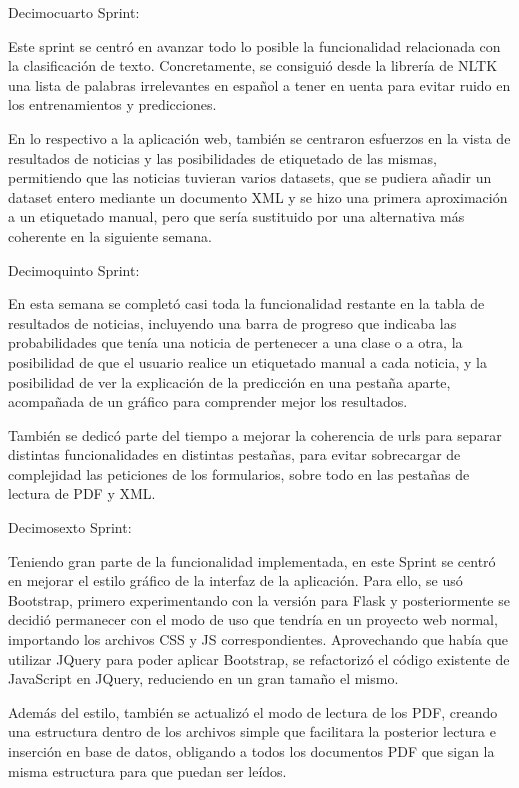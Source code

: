 Decimocuarto Sprint:

Este sprint se centró en avanzar todo lo posible la funcionalidad relacionada con la clasificación de texto. Concretamente, se consiguió desde la librería de NLTK una lista de palabras irrelevantes en español a tener en uenta para evitar ruido en los entrenamientos y predicciones. 

En lo respectivo a la aplicación web, también se centraron esfuerzos en la vista de resultados de noticias y las posibilidades de etiquetado de las mismas, permitiendo que las noticias tuvieran varios datasets, que se pudiera añadir un dataset entero mediante un documento XML y se hizo una primera aproximación a un etiquetado manual, pero que sería sustituido por una alternativa más coherente en la siguiente semana.

Decimoquinto Sprint:

En esta semana se completó casi toda la funcionalidad restante en la tabla de resultados de noticias, incluyendo una barra de progreso que indicaba las probabilidades que tenía una noticia de pertenecer a una clase o a otra, la posibilidad de que el usuario realice un etiquetado manual a cada noticia, y la posibilidad de ver la explicación de la predicción en una pestaña aparte, acompañada de un gráfico para comprender mejor los resultados.

También se dedicó parte del tiempo a mejorar la coherencia de urls para separar distintas funcionalidades en distintas pestañas, para evitar sobrecargar de complejidad las peticiones de los formularios, sobre todo en las pestañas de lectura de PDF y XML.

Decimosexto Sprint:

Teniendo gran parte de la funcionalidad implementada, en este Sprint se centró en mejorar el estilo gráfico de la interfaz de la aplicación. Para ello, se usó Bootstrap, primero experimentando con la versión para Flask y posteriormente se decidió permanecer con el modo de uso que tendría en un proyecto web normal, importando los archivos CSS y JS correspondientes. Aprovechando que había que utilizar JQuery para poder aplicar Bootstrap, se refactorizó el código existente de JavaScript en JQuery, reduciendo en un gran tamaño el mismo.

Además del estilo, también se actualizó el modo de lectura de los PDF, creando una estructura dentro de los archivos simple que facilitara la posterior lectura e inserción en base de datos, obligando a todos los documentos PDF que sigan la misma estructura para que puedan ser leídos. 


